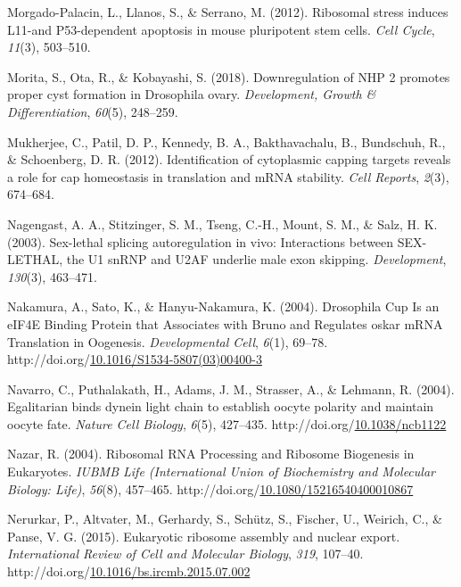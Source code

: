 \documentclass[12pt,oneside]{reedthesis}
\newlength{\cslhangindent}
\newenvironment{CSLReferences}[2] %
 {%
  \setlength{\parindent}{0pt}
  \ifodd #1 \everypar{\setlength{\hangindent}{\cslhangindent}}\ignorespaces\fi
  \ifnum #2 > 0
  \setlength{\parskip}{#2\baselineskip}
  \fi
 }%
 {}
\begin{document}
\begin{CSLReferences}{1}{0}
\leavevmode{}%
Morgado-Palacin, L., Llanos, S., \& Serrano, M. (2012). Ribosomal stress induces {L11}-and P53-dependent apoptosis in mouse pluripotent stem cells. \emph{Cell Cycle}, \emph{11}(3), 503--510.

\leavevmode{}%
Morita, S., Ota, R., \& Kobayashi, S. (2018). Downregulation of {NHP} 2 promotes proper cyst formation in {Drosophila} ovary. \emph{Development, Growth \& Differentiation}, \emph{60}(5), 248--259.

\leavevmode{}%
Mukherjee, C., Patil, D. P., Kennedy, B. A., Bakthavachalu, B., Bundschuh, R., \& Schoenberg, D. R. (2012). Identification of cytoplasmic capping targets reveals a role for cap homeostasis in translation and {mRNA} stability. \emph{Cell Reports}, \emph{2}(3), 674--684.

\leavevmode{}%
Nagengast, A. A., Stitzinger, S. M., Tseng, C.-H., Mount, S. M., \& Salz, H. K. (2003). Sex-lethal splicing autoregulation in vivo: Interactions between {SEX}-{LETHAL}, the {U1 snRNP} and {U2AF} underlie male exon skipping. \emph{Development}, \emph{130}(3), 463--471.

\leavevmode{}%
Nakamura, A., Sato, K., \& Hanyu-Nakamura, K. (2004). Drosophila {Cup Is} an {eIF4E Binding Protein} that {Associates} with {Bruno} and {Regulates} oskar {mRNA Translation} in {Oogenesis}. \emph{Developmental Cell}, \emph{6}(1), 69--78. http://doi.org/\href{https://doi.org/10.1016/S1534-5807(03)00400-3}{10.1016/S1534-5807(03)00400-3}

\leavevmode{}%
Navarro, C., Puthalakath, H., Adams, J. M., Strasser, A., \& Lehmann, R. (2004). Egalitarian binds dynein light chain to establish oocyte polarity and maintain oocyte fate. \emph{Nature Cell Biology}, \emph{6}(5), 427--435. http://doi.org/\href{https://doi.org/10.1038/ncb1122}{10.1038/ncb1122}

\leavevmode{}%
Nazar, R. (2004). Ribosomal {RNA Processing} and {Ribosome Biogenesis} in {Eukaryotes}. \emph{IUBMB Life (International Union of Biochemistry and Molecular Biology: Life)}, \emph{56}(8), 457--465. http://doi.org/\href{https://doi.org/10.1080/15216540400010867}{10.1080/15216540400010867}

\leavevmode{}%
Nerurkar, P., Altvater, M., Gerhardy, S., Schütz, S., Fischer, U., Weirich, C., \& Panse, V. G. (2015). Eukaryotic ribosome assembly and nuclear export. \emph{International Review of Cell and Molecular Biology}, \emph{319}, 107--40. http://doi.org/\href{https://doi.org/10.1016/bs.ircmb.2015.07.002}{10.1016/bs.ircmb.2015.07.002}


\end{CSLReferences}
\end{document}
